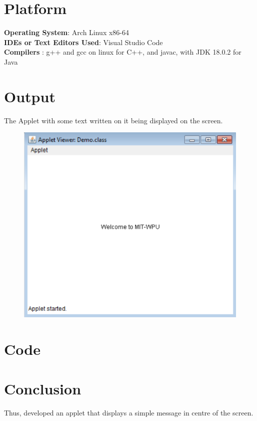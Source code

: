 \documentclass[11pt]{article}
\begin{document}
\section{Platform}
\textbf{Operating System}: Arch Linux x86-64 \\
\textbf{IDEs or Text Editors Used}: Visual Studio Code\\
\textbf{Compilers} : g++ and gcc on linux for C++, and javac, with JDK 18.0.2 for Java\\

\section{Output}
The Applet with some text written on it being displayed on the screen.
\begin{figure}[H]
	\centering
	\includegraphics[scale=0.55]{applet.png}
	\caption{}
\end{figure}

\section{Code}




\section{Conclusion}
Thus, developed an applet that displays a simple message in centre of the screen.
\end{document}
